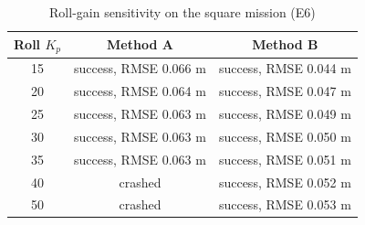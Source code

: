 \begin{table}[h]
\centering
\caption{Roll-gain sensitivity on the square mission (E6)}
\label{tab:e6}
\begin{tabular}{|c|c|c|}
\hline
\textbf{Roll $K_p$} & \textbf{Method A} & \textbf{Method B} \\ \hline
15 & success, RMSE 0.066 m & success, RMSE 0.044 m \\ \hline
20 & success, RMSE 0.064 m & success, RMSE 0.047 m \\ \hline
25 & success, RMSE 0.063 m & success, RMSE 0.049 m \\ \hline
30 & success, RMSE 0.063 m & success, RMSE 0.050 m \\ \hline
35 & success, RMSE 0.063 m & success, RMSE 0.051 m \\ \hline
40 & crashed & success, RMSE 0.052 m \\ \hline
50 & crashed & success, RMSE 0.053 m \\ \hline
\end{tabular}
\end{table}

